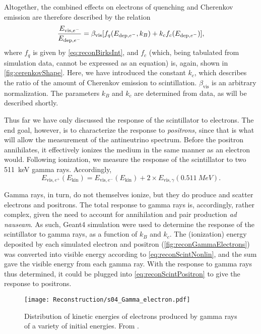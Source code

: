 \documentclass[../thesis.tex]{subfiles}
\begin{document}
Altogether, the combined effects on electrons of quenching and Cherenkov emission are therefore described by the relation
\begin{equation}
  \label{eq:reconScintNonlin}
  \frac{E_{\mathrm{vis},e^-}}{E_{\mathrm{dep},e^-}} = \beta_{\mathrm{vis}}[f_q(E_{\mathrm{dep},e^-}, k_B) + k_c f_c(E_{\mathrm{dep},e^-})],
\end{equation}
where $f_q$ is given by \autoref{eq:reconBirksInt}, and $f_c$ (which, being tabulated from simulation data, cannot be expressed as an equation) is, again, shown in \autoref{fig:cerenkovShape}. Here, we have introduced the constant $k_c$, which describes the ratio of the amount of Cherenkov emission to scintillation. $\beta_{\mathrm{vis}}$ is an arbitrary normalization. The parameters $k_B$ and $k_c$ are determined from data, as will be described shortly.

Thus far we have only discussed the response of the scintillator to electrons. The end goal, however, is to characterize the response to \emph{positrons,} since that is what will allow the measurement of the antineutrino spectrum. Before the positron annihilates, it effectively ionizes the medium in the same manner as an electron would. Following ionization, we measure the response of the scintillator to two 511~keV gamma rays. Accordingly,
\begin{equation}
  \label{eq:reconScintPositron}
  E_{\mathrm{vis},e^+}(E_{\mathrm{kin}}) = E_{\mathrm{vis},e^-}(E_{\mathrm{kin}}) + 2 \times E_{\mathrm{vis},\gamma}(\SI{0.511}{MeV}).
\end{equation}

Gamma rays, in turn, do not themselves ionize, but they do produce and scatter electrons and positrons. The total response to gamma rays is, accordingly, rather complex, given the need to account for annihilation and pair production \emph{ad nauseam}. As such, Geant4 simulation were used to determine the response of the scintillator to gamma rays, as a function of $k_B$ and $k_c$. The (ionization) energy deposited by each simulated electron and positron (\autoref{fig:reconGammaElectrons}) was converted into visible energy according to \autoref{eq:reconScintNonlin}, and the sum gave the visible energy from each gamma ray. With the response to gamma rays thus determined, it could be plugged into \autoref{eq:reconScintPositron} to give the response to positrons.

\begin{figure}[h]
  \texttt{[image: Reconstruction/s04\_Gamma\_electron.pdf]}
  \caption{Distribution of kinetic energies of electrons produced by gamma rays of a variety of initial energies. From \cite{NonlinearityPaper}.}
  \label{fig:reconGammaElectrons}
\end{figure}
\end{document}
